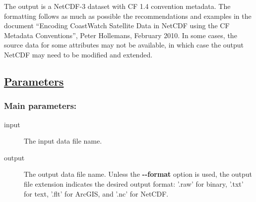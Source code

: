  The output is a NetCDF-3 dataset with CF 1.4 convention metadata. The formatting follows as much as possible the recommendations and examples in the document ``Encoding CoastWatch Satellite Data in NetCDF using the CF Metadata Conventions'', Peter Hollemans, February 2010. In some cases, the source data for some attributes may not be available, in which case the output NetCDF may need to be modified and extended.
\subsection*{\underline{Parameters}}
\subsubsection*{Main parameters:}
\begin{description}
\item[ input ] The input data file name. 
\item[ output ] The output data file name. Unless the \textbf{-{-}format}
 option is used, the output file extension indicates the desired output format: '.raw' for binary, '.txt' for text, '.flt' for ArcGIS, and '.nc' for NetCDF. 

\end{description}
